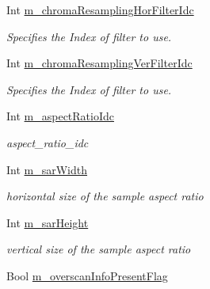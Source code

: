 \begin{DoxyCompactItemize}
\mbox{\label{class_t_enc_cfg_a3e54ec4cf55163094c5306d0d3bb1c20}} 
Int \hyperlink{class_t_enc_cfg_a3e54ec4cf55163094c5306d0d3bb1c20}{m\+\_\+chroma\+Resampling\+Hor\+Filter\+Idc}
\begin{DoxyCompactList}\small\item\em Specifies the Index of filter to use. \end{DoxyCompactList}\item 
\mbox{\label{class_t_enc_cfg_a8086f11b85d68eca81520c593c300592}} 
Int \hyperlink{class_t_enc_cfg_a8086f11b85d68eca81520c593c300592}{m\+\_\+chroma\+Resampling\+Ver\+Filter\+Idc}
\begin{DoxyCompactList}\small\item\em Specifies the Index of filter to use. \end{DoxyCompactList}\item 
\mbox{\label{class_t_enc_cfg_a71925abdb0f45c8277e935c34630d32f}} 
Int \hyperlink{class_t_enc_cfg_a71925abdb0f45c8277e935c34630d32f}{m\+\_\+aspect\+Ratio\+Idc}
\begin{DoxyCompactList}\small\item\em aspect\+\_\+ratio\+\_\+idc \end{DoxyCompactList}\item 
\mbox{\label{class_t_enc_cfg_a8cdf80db937dd94c4001a9975c7fc634}} 
Int \hyperlink{class_t_enc_cfg_a8cdf80db937dd94c4001a9975c7fc634}{m\+\_\+sar\+Width}
\begin{DoxyCompactList}\small\item\em horizontal size of the sample aspect ratio \end{DoxyCompactList}\item 
\mbox{\label{class_t_enc_cfg_afcbeb50bdd48681559b31a7c17c19213}} 
Int \hyperlink{class_t_enc_cfg_afcbeb50bdd48681559b31a7c17c19213}{m\+\_\+sar\+Height}
\begin{DoxyCompactList}\small\item\em vertical size of the sample aspect ratio \end{DoxyCompactList}\item 
\mbox{\label{class_t_enc_cfg_abe644a49eba52fbf58c627c0b38713ec}} 
Bool \hyperlink{class_t_enc_cfg_abe644a49eba52fbf58c627c0b38713ec}{m\+\_\+overscan\+Info\+Present\+Flag}

\end{DoxyCompactItemize}
